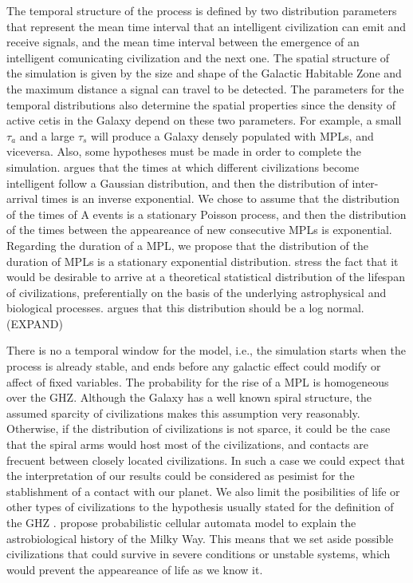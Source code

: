 \documentclass[crop]{CSLB}%
\begin{document}
The temporal structure of the process is defined by two distribution
parameters that represent the mean time interval that an intelligent
civilization can emit and receive signals, and the mean time interval
between the emergence of an intelligent comunicating civilization and
the next one.
%
The spatial structure of the simulation is given by the size and shape
of the Galactic Habitable Zone and the maximum distance a signal can
travel to be detected.
%
The parameters for the temporal distributions also determine the
spatial properties since the density of active cetis in the Galaxy
depend on these two parameters.
%
For example, a small $\tau_a$ and a large $\tau_s$ will produce a
Galaxy densely populated with MPLs, and viceversa.
%
Also, some hypotheses must be made in order to complete the
simulation.
%
\citet{forgan_spatiotemporal_2011} argues that the times at which
different civilizations become intelligent 
follow a Gaussian distribution, and then the distribution of
inter-arrival times is an inverse exponential.
%
We chose to assume that the distribution of the times of A events is a
stationary Poisson process, and then the distribution of the times between the
appeareance of new consecutive MPLs is exponential.
%
Regarding the duration of a MPL, we propose that the distribution of
the duration of MPLs is a stationary exponential distribution.
%
\citet{balbi_impact_2018} stress the fact that it would be desirable to arrive
at a theoretical statistical distribution of the lifespan of
civilizations, preferentially on the basis of the underlying
astrophysical and biological processes.
%
\citet{maccone_lognormals_2014} argues that this distribution should be a log normal.
(EXPAND)



There is no a temporal window for the model, i.e., the simulation
starts when the process is already stable, and ends before any
galactic effect could modify or affect of fixed variables.
%
The probability for the rise of a MPL is homogeneous over the GHZ.
%
Although the Galaxy has a well known spiral structure, the assumed
sparcity of civilizations makes this assumption very reasonably.
%
Otherwise, if the distribution of civilizations is not sparce, it
could be the case that the spiral arms would host most of the
civilizations, and contacts are frecuent between closely located
civilizations.
%
In such a case we could expect that the interpretation of our results
could be considered as pesimist for the stablishment of a contact with
our planet.
%
We also limit the posibilities of life or other types of civilizations
to the hypothesis usually stated for the definition of the GHZ
\citep{dayal_habitability_2016,gonzalez_galactic_2001,lineweaver_galactic_2004,gonzalez_habitable_2005,morrison_extending_2015,haqq-misra_evolution_2019,rahvar_cosmic_2016,gobat_evolution_2016,
rahvar_cosmic_2016}.
%
\citet{vukotic_astrobiological_2012} propose probabilistic cellular
automata model to explain the astrobiological history of the Milky
Way.
%
This means that we set aside possible civilizations that could survive
in severe conditions or unstable systems, which would prevent the
appeareance of life as we know it.
\end{document}
